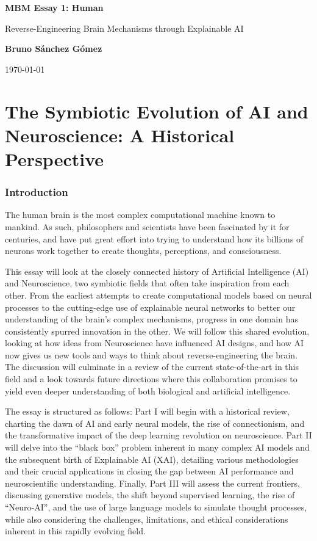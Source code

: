 \documentclass[11pt,a4paper]{article}
\author{Bruno Sánchez Gómez}
\date{\today}
\begin{document}
\begin{titlepage}
    \centering
    \vspace*{2cm}
    {\Huge \bfseries MBM Essay 1: Human \par}
    \vspace{2cm}
    {\Large {\Huge Reverse-Engineering Brain Mechanisms through Explainable AI} \par}
    \vspace{8cm}
    {\large \textbf{Bruno Sánchez Gómez} \par}
    \vfill
    {\large \today \par}
\end{titlepage}


\part{The Symbiotic Evolution of AI and Neuroscience: A Historical Perspective}

\section{Introduction}
The human brain is the most complex computational machine known to mankind. As such, philosophers and scientists have been fascinated by it for centuries, and have put great effort into trying to understand how its billions of neurons work together to create thoughts, perceptions, and consciousness.

This essay will look at the closely connected history of Artificial Intelligence (AI) and Neuroscience, two symbiotic fields that often take inspiration from each other. From the earliest attempts to create computational models based on neural processes to the cutting-edge use of explainable neural networks to better our understanding of the brain's complex mechanisms, progress in one domain has consistently spurred innovation in the other. We will follow this shared evolution, looking at how ideas from Neuroscience have influenced AI designs, and how AI now gives us new tools and ways to think about reverse-engineering the brain. The discussion will culminate in a review of the current state-of-the-art in this field and a look towards future directions where this collaboration promises to yield even deeper understanding of both biological and artificial intelligence.

The essay is structured as follows: Part I will begin with a historical review, charting the dawn of AI and early neural models, the rise of connectionism, and the transformative impact of the deep learning revolution on neuroscience. Part II will delve into the ``black box'' problem inherent in many complex AI models and the subsequent birth of Explainable AI (XAI), detailing various methodologies and their crucial applications in closing the gap between AI performance and neuroscientific understanding. Finally, Part III will assess the current frontiers, discussing generative models, the shift beyond supervised learning, the rise of ``Neuro-AI'', and the use of large language models to simulate thought processes, while also considering the challenges, limitations, and ethical considerations inherent in this rapidly evolving field.
\end{document}
